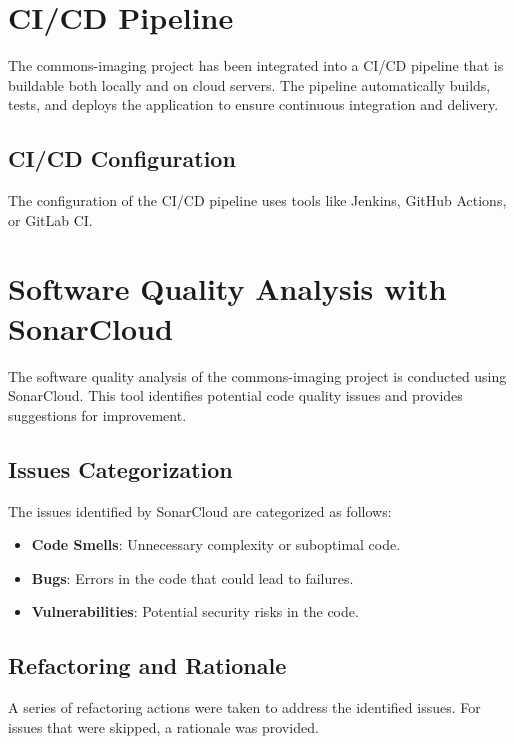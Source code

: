 \documentclass[a4paper,12pt]{report}
\begin{document}
\newpage

\chapter{CI/CD Pipeline}
The commons-imaging project has been integrated into a CI/CD pipeline that is buildable both locally and on cloud servers. The pipeline automatically builds, tests, and deploys the application to ensure continuous integration and delivery.

\section{CI/CD Configuration}
The configuration of the CI/CD pipeline uses tools like Jenkins, GitHub Actions, or GitLab CI.

\newpage

\chapter{Software Quality Analysis with SonarCloud}
The software quality analysis of the commons-imaging project is conducted using SonarCloud. This tool identifies potential code quality issues and provides suggestions for improvement.

\section{Issues Categorization}
The issues identified by SonarCloud are categorized as follows:
\begin{itemize}
    \item \textbf{Code Smells}: Unnecessary complexity or suboptimal code.
    \item \textbf{Bugs}: Errors in the code that could lead to failures.
    \item \textbf{Vulnerabilities}: Potential security risks in the code.
\end{itemize}

\section{Refactoring and Rationale}
A series of refactoring actions were taken to address the identified issues. For issues that were skipped, a rationale was provided. 

\newpage

\end{document}
